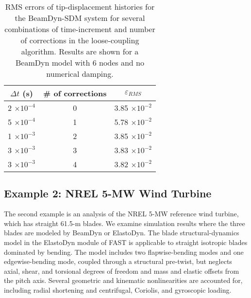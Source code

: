 \documentclass{aiaa-tc}
\begin{document}
\begin{table}[h!tp]
    \centering
    \begin{tabular}{| c | c | c |}
    \hline
    $\Delta t$ (s) & \# of corrections & $\varepsilon_{RMS}$ \\ \hline
    2 $\times 10^{-4}$ & 0 & 3.85 $\times 10^{-2}$ \\ \hline
    5 $\times 10^{-4}$ & 1 & 5.78 $\times 10^{-2}$ \\ \hline
    1 $\times 10^{-3}$ & 2 & 3.85 $\times 10^{-2}$ \\ \hline
    3 $\times 10^{-3}$ & 3 & 3.83 $\times 10^{-2}$ \\ \hline
    3 $\times 10^{-3}$ & 4 & 3.82 $\times 10^{-2}$ \\
    \hline
    \end{tabular}
    \label{tab:RMS_pc}
    \caption{RMS errors of tip-displacement histories for the BeamDyn-SDM system for several combinations of time-increment and number of corrections in the loose-coupling algorithm.  Results are shown for a BeamDyn model with 6 nodes and no numerical damping.}
\end{table}


\subsection{Example 2: NREL 5-MW Wind Turbine}

The second example is an analysis of the NREL 5-MW reference wind turbine\cite{Jonkman-etal:2009}, which has straight 61.5-m blades.  
We examine simulation results where the three blades are modeled by BeamDyn or ElastoDyn.
The blade structural-dynamics model in the ElastoDyn module of FAST is applicable to straight isotropic blades dominated by bending.  The model includes two flapwise-bending modes and one edgewise-bending mode, coupled through a structural pre-twist, but neglects axial, shear, and torsional degrees of freedom and mass and elastic offsets from the pitch axis.  Several geometric and kinematic nonlinearities are accounted for, including radial shortening and centrifugal, Coriolis, and gyroscopic loading.
\end{document}
